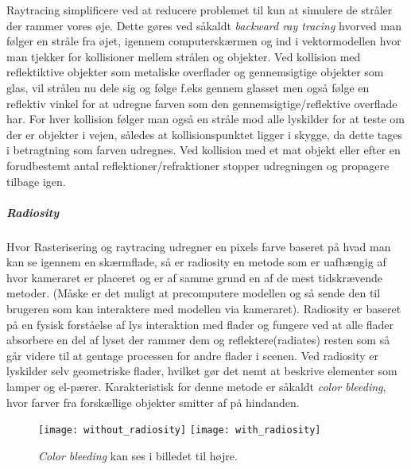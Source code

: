 \newline Raytracing simplificere ved at reducere problemet til kun at simulere de stråler der rammer vores øje. Dette gøres ved såkaldt \textit{backward ray tracing} hvorved man følger en stråle fra øjet, igennem computerskærmen og ind i vektormodellen hvor man tjekker for kollisioner mellem strålen og objekter. Ved kollision med reflektiktive objekter som metaliske overflader og gennemsigtige objekter som glas, vil strålen nu dele sig og følge f.eks gennem glasset men også følge en reflektiv vinkel for at udregne farven som den gennemsigtige/reflektive overflade har. For hver kollision følger man også en stråle mod alle lyskilder for at teste om der er objekter i vejen, således at kollisionspunktet ligger i skygge, da dette tages i betragtning som farven udregnes. Ved kollision med et mat objekt eller efter en forudbestemt antal reflektioner/refraktioner stopper udregningen og propagere tilbage igen.
\subparagraph{Radiosity}
Hvor Rasterisering og raytracing udregner en pixels farve baseret på hvad man kan se igennem en skærmflade, så er radiosity en metode som er uafhængig af hvor kameraret er placeret og er af samme grund en af de mest tidskrævende metoder. (Måske er det muligt at precomputere modellen og så sende den til brugeren som kan interaktere med modellen via kameraret). 
\newline Radiosity er baseret på en fysisk forståelse af lys interaktion med flader og fungere ved at alle flader absorbere en del af lyset der rammer dem og reflektere(radiates) resten som så går videre til at gentage processen for andre flader i scenen. Ved radiosity er lyskilder selv geometriske flader, hvilket gør det nemt at beskrive elementer som lamper og el-pærer. Karakteristisk for denne metode er såkaldt \textit{color bleeding}, hvor farver fra forskællige objekter smitter af på hindanden.
\begin{figure}[H]
    \centering
    \texttt{[image: without\_radiosity]}
    \texttt{[image: with\_radiosity]}
    \caption{\textit{Color bleeding} kan ses i billedet til højre.}
    \label{fig:colorbleeding}
\end{figure}


